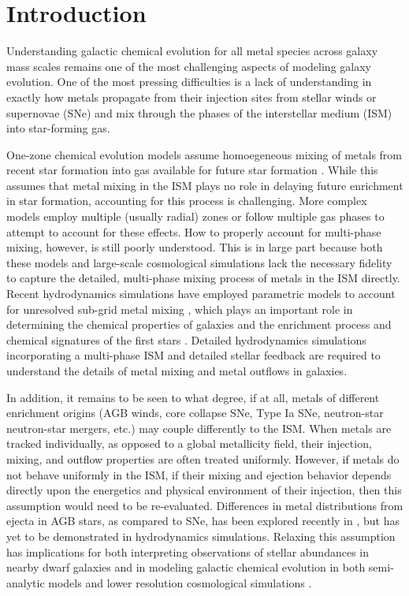 \section{Introduction}
Understanding galactic chemical evolution for all metal species across galaxy mass scales remains one of the most challenging aspects of modeling galaxy evolution. One of the most pressing difficulties is a lack of understanding in exactly how metals propagate from their injection sites from stellar winds or supernovae (SNe) and mix through the phases of the interstellar medium (ISM) into star-forming gas.

One-zone chemical evolution models assume homoegeneous mixing of metals from recent star formation into gas available for future star formation \citep[e.g.][]{Lanfranchi2006b,Kirby2011-III,Cote2017a,Andrews2017}. While this assumes that metal mixing in the ISM plays no role in delaying future enrichment in star formation, accounting for this process is challenging. More complex models \citep[e.g.][]{SchonrichBinney2009,Pezzulli2016} employ multiple (usually radial) zones or follow multiple gas phases to attempt to account for these effects. How to properly account for multi-phase mixing, however, is still poorly understood. This is in large part because both these models and large-scale cosmological simulations lack the necessary fidelity to capture the detailed, multi-phase mixing process of metals in the ISM directly. Recent hydrodynamics simulations have employed parametric models to account for unresolved sub-grid metal mixing \citep{PanScannapiecoScalo2013,Sarmento2017,Sarmento2018}, which plays an important role in determining the chemical properties of galaxies \citep[e.g.][]{Shen2010, Pilkington2012, Few2012, Brook2014, FengKrumholz2014, Armillotta2018, Escala2018, Rennehan2018} 
and the enrichment process and chemical signatures of the first stars \citep[e.g.][]{Jeon2015,Ritter2015,Smith2015}.
Detailed hydrodynamics simulations incorporating a multi-phase ISM and detailed stellar feedback are required to understand the details of metal mixing and metal outflows in galaxies.

In addition, it remains to be seen to what degree, if at all, metals of different enrichment origins (AGB winds, core collapse SNe, Type Ia SNe, neutron-star neutron-star mergers, etc.) may couple differently to the ISM. When metals are tracked individually, as opposed to a global metallicity field, their injection, mixing, and outflow properties are often treated uniformly. However, if metals do not behave uniformly in the ISM, if their mixing and ejection behavior depends directly upon the energetics and physical environment of their injection, then this assumption would need to be re-evaluated. Differences in metal distributions from ejecta in AGB stars, as compared to SNe, has been explored recently in \cite{KrumholzTing2018}, but has yet to be demonstrated in hydrodynamics simulations. Relaxing this assumption has implications for both interpreting observations of stellar abundances in nearby dwarf galaxies and in modeling galactic chemical evolution in both semi-analytic models and lower resolution cosmological simulations \citep[e.g.][]{Cote2018}.

